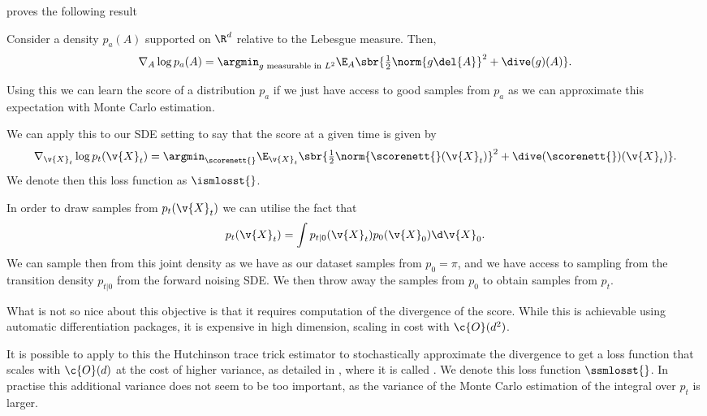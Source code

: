 \textcite{hyvarinen05a} proves the following result
\begin{theorem}
	\label{def:ism}
	Consider a density \(p_a(A)\) supported on \(\R^d\) relative to the Lebesgue measure.
	Then,
	\[\nabla_{A} \log p_a(A) = \argmin_{g\text{ measurable in }L^2} \E_{A}\sbr{ { \tfrac{1}{2} \norm{g\del{A}}^2 + \dive(g)(A)}}.\]
\end{theorem}
Using this we can learn the score of a distribution \(p_a\) if we just have access to good samples from \(p_a\) as we can approximate this expectation with Monte Carlo estimation.

We can apply this to our SDE setting to say that the score at a given time is given by \[\nabla_{\v{X}_t} \log p_t(\v{X}_t) = \argmin_{\scorenett{}} \E_{\v{X}_t} \sbr{ \tfrac{1}{2} \norm{\scorenett{}(\v{X}_t)}^2 + \dive(\scorenett{})(\v{X}_t)}.\]
We denote then this loss function as \(\ismlosst{}\).

In order to draw samples from \(p_t(\v{X}_t)\) we can utilise the fact that \[p_t(\v{X}_t) = \int p_{t|0}(\v{X}_t) p_0(\v{X}_0) \d \v{X}_0.\]
We can sample then from this joint density as we have as our dataset samples from \(p_0 = \pi\), and we have access to sampling from the transition density \( p_{t|0}\) from the forward noising SDE.
We then throw away the samples from \(p_0\) to obtain samples from \(p_t\).

What is not so nice about this objective is that it requires computation of the divergence of the score.
While this is achievable using automatic differentiation packages, it is expensive in high dimension, scaling in cost with \(\c{O}(d^2)\).

It is possible to apply to this the Hutchinson trace trick estimator \parencite{hutchinson1989stochastic} to stochastically approximate the divergence to get a loss function that scales with \(\c{O}(d)\) at the cost of higher variance, as detailed in \textcite{song2020sliced}, where it is called .
We denote this loss function \(\ssmlosst{}\).
In practise this additional variance does not seem to be too important, as the variance of the Monte Carlo estimation of the integral over \(p_t\) is larger.

